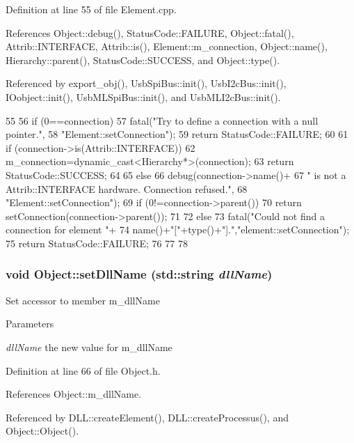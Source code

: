 Definition at line 55 of file Element.cpp.

References Object::debug(), StatusCode::FAILURE, Object::fatal(), Attrib::INTERFACE, Attrib::is(), Element::m\_\-connection, Object::name(), Hierarchy::parent(), StatusCode::SUCCESS, and Object::type().

Referenced by export\_\-obj(), UsbSpiBus::init(), UsbI2cBus::init(), IOobject::init(), UsbMLSpiBus::init(), and UsbMLI2cBus::init().


\begin{DoxyCode}
55                                                       {
56   if (0==connection){
57     fatal("Try to define a connection with a null pointer.",
58         "Element::setConnection");
59     return StatusCode::FAILURE;
60   }
61   if (connection->is(Attrib::INTERFACE)){
62     m_connection=dynamic_cast<Hierarchy*>(connection);
63     return StatusCode::SUCCESS;
64   }
65   else {
66     debug(connection->name()+
67         " is not a Attrib::INTERFACE hardware. Connection refused.",
68         "Element::setConnection");
69     if (0!=connection->parent()){
70       return setConnection(connection->parent());
71     }
72     else{
73       fatal("Could not find a connection for element "+
74           name()+"["+type()+"].","element::setConnection");
75       return StatusCode::FAILURE;
76     }
77   }
78 }
\end{DoxyCode}
\hypertarget{classObject_a870c5af919958c2136623b2d7816d123}{
\subsubsection[{setDllName}]{\setlength{\rightskip}{0pt plus 5cm}void Object::setDllName (std::string {\em dllName})}}
\label{classObject_a870c5af919958c2136623b2d7816d123}
Set accessor to member m\_\-dllName 
\begin{DoxyParams}{Parameters}
\item[{\em dllName}]the new value for m\_\-dllName \end{DoxyParams}


Definition at line 66 of file Object.h.

References Object::m\_\-dllName.

Referenced by DLL::createElement(), DLL::createProcessus(), and Object::Object().


